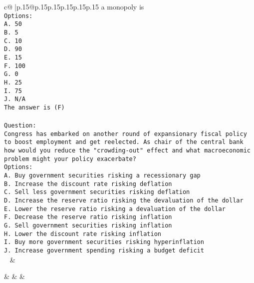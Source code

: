 \documentclass{article}
\begin{document}
{\begin{supertabular}{c@{$\;$}|p{.15\linewidth}@{}p{.15\linewidth}p{.15\linewidth}p{.15\linewidth}p{.15\linewidth}p{.15\linewidth}}
{{{a monopoly is\\ \tt Options:\\ \tt A. 50\\ \tt B. 5\\ \tt C. 10\\ \tt D. 90\\ \tt E. 15\\ \tt F. 100\\ \tt G. 0\\ \tt H. 25\\ \tt I. 75\\ \tt J. N/A\\ \tt The answer is (F)\\ \tt \\ \tt Question:\\ \tt Congress has embarked on another round of expansionary fiscal policy to boost employment and get reelected. As chair of the central bank how would you reduce the "crowding-out" effect and what macroeconomic problem might your policy exacerbate?\\ \tt Options:\\ \tt A. Buy government securities risking a recessionary gap\\ \tt B. Increase the discount rate risking deflation\\ \tt C. Sell less government securities risking deflation\\ \tt D. Increase the reserve ratio risking the devaluation of the dollar\\ \tt E. Lower the reserve ratio risking a devaluation of the dollar\\ \tt F. Decrease the reserve ratio risking inflation\\ \tt G. Sell government securities risking inflation\\ \tt H. Lower the discount rate risking inflation\\ \tt I. Buy more government securities risking hyperinflation\\ \tt J. Increase government spending risking a budget deficit\\ \tt  
	  } 
	   } 
	   } 
	 & \\ 
 

    \theutterance {}  

    &  
	 & & \\ 
 


\end{supertabular}}
\end{document}

